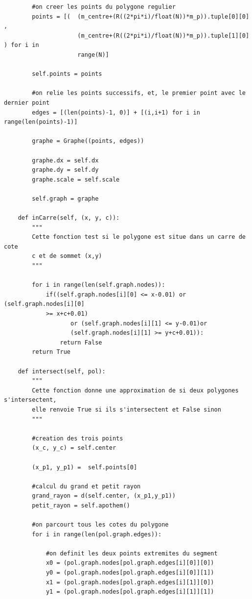 \documentclass{book}
\begin{document}
\begin{appendices}
\begin{lstlisting}
        #on creer les points du polygone regulier
        points = [(  (m_centre+(R((2*pi*i)/float(N))*m_p)).tuple[0][0]  ,
                     (m_centre+(R((2*pi*i)/float(N))*m_p)).tuple[1][0]  ) for i in
                     range(N)]
        
        self.points = points
    
        #on relie les points successifs, et, le premier point avec le dernier point
        edges = [(len(points)-1, 0)] + [(i,i+1) for i in range(len(points)-1)]
        
        graphe = Graphe((points, edges))
        
        graphe.dx = self.dx
        graphe.dy = self.dy
        graphe.scale = self.scale
        
        self.graph = graphe
        
    def inCarre(self, (x, y, c)):
        """
        Cette fonction test si le polygone est situe dans un carre de cote
        c et de sommet (x,y)
        """
        
        for i in range(len(self.graph.nodes)):
            if((self.graph.nodes[i][0] <= x-0.01) or (self.graph.nodes[i][0]
            >= x+c+0.01)
                   or (self.graph.nodes[i][1] <= y-0.01)or 
                   (self.graph.nodes[i][1] >= y+c+0.01)):
                return False
        return True
    
    def intersect(self, pol):
        """
        Cette fonction donne une approximation de si deux polygones s'intersectent,
        elle renvoie True si ils s'intersectent et False sinon
        """
        
        #creation des trois points
        (x_c, y_c) = self.center
        
        (x_p1, y_p1) =  self.points[0]
            
        #calcul du grand et petit rayon
        grand_rayon = d(self.center, (x_p1,y_p1))
        petit_rayon = self.apothem()
        
        #on parcourt tous les cotes du polygone
        for i in range(len(pol.graph.edges)):
            
            #on definit les deux points extremites du segment
            x0 = (pol.graph.nodes[pol.graph.edges[i][0]][0])
            y0 = (pol.graph.nodes[pol.graph.edges[i][0]][1])
            x1 = (pol.graph.nodes[pol.graph.edges[i][1]][0])
            y1 = (pol.graph.nodes[pol.graph.edges[i][1]][1])
                        

\end{lstlisting}
\end{appendices}
\end{document}
